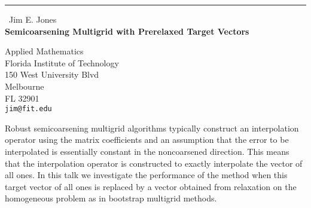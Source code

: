 \documentclass{report}
\begin{document}
\begin{center}
\rule{6in}{1pt} \
{\large Jim E. Jones \\
{\bf Semicoarsening Multigrid with Prerelaxed Target Vectors }}

Applied Mathematics \\ Florida Institute of Technology \\ 150 West University Blvd \\ Melbourne \\ FL 32901
\\
{\tt jim@fit.edu}\end{center}

Robust semicoarsening multigrid algorithms typically construct an
interpolation operator using the matrix coefficients and an assumption
that the error to be interpolated is essentially constant in the
noncoarsened direction. This means that the interpolation operator is
constructed to exactly interpolate the vector of all ones. In this talk
we investigate the performance of the method when this target vector of
all ones is replaced by a vector obtained from relaxation on the
homogeneous problem as in bootstrap multigrid methods.
\end{document}
